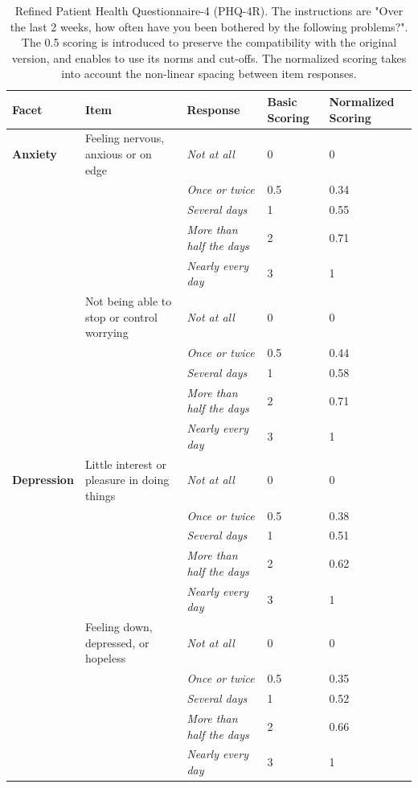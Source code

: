 \documentclass[
  man,floatsintext]{apa6}
\begin{document}
\begin{table}[tbp]

\begin{center}
\begin{threeparttable}

\caption{\label{tab:unnamed-chunk-4}Refined Patient Health Questionnaire-4 (PHQ-4R). The instructions are "Over the last 2 weeks, how often have you been bothered by the following problems?". The 0.5 scoring is introduced to preserve the compatibility with the original version, and enables to use its norms and cut-offs. The normalized scoring takes into account the non-linear spacing between item responses.}

\scriptsize{

\begin{tabular}{lllll}
\toprule
Facet & Item & Response & Basic Scoring & Normalized Scoring\\
\midrule
\textbf{Anxiety} & Feeling nervous, anxious or on edge & \textit{Not at all} & 0 & 0\\
 &  & \textit{Once or twice} & 0.5 & 0.34\\
 &  & \textit{Several days} & 1 & 0.55\\
 &  & \textit{More than half the days} & 2 & 0.71\\
 &  & \textit{Nearly every day} & 3 & 1\\ \midrule
 & Not being able to stop or control worrying & \textit{Not at all} & 0 & 0\\
 &  & \textit{Once or twice} & 0.5 & 0.44\\
 &  & \textit{Several days} & 1 & 0.58\\
 &  & \textit{More than half the days} & 2 & 0.71\\
 &  & \textit{Nearly every day} & 3 & 1\\ \midrule
\textbf{Depression} & Little interest or pleasure in doing things & \textit{Not at all} & 0 & 0\\
 &  & \textit{Once or twice} & 0.5 & 0.38\\
 &  & \textit{Several days} & 1 & 0.51\\
 &  & \textit{More than half the days} & 2 & 0.62\\
 &  & \textit{Nearly every day} & 3 & 1\\ \midrule
 & Feeling down, depressed, or hopeless & \textit{Not at all} & 0 & 0\\
 &  & \textit{Once or twice} & 0.5 & 0.35\\
 &  & \textit{Several days} & 1 & 0.52\\
 &  & \textit{More than half the days} & 2 & 0.66\\
 &  & \textit{Nearly every day} & 3 & 1\\
\bottomrule
\end{tabular}

}

\end{threeparttable}
\end{center}

\end{table}
\end{document}

